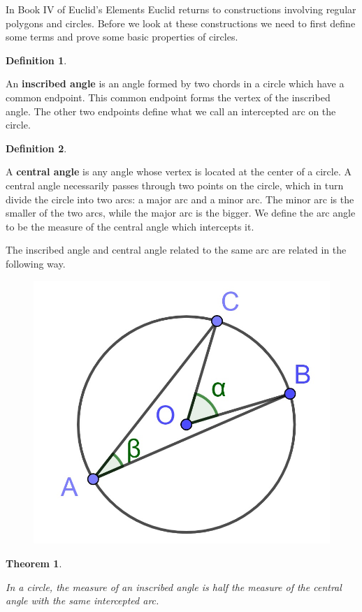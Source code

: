 \documentclass[
]{book}
\newtheorem{theorem}{Theorem}[chapter]
\theoremstyle{definition}
\newtheorem{definition}{Definition}[chapter]
\theoremstyle{definition}
\theoremstyle{definition}
\theoremstyle{definition}
\theoremstyle{remark}
\begin{document}
In Book IV of Euclid's Elements \citep{Heath1908_2} Euclid returns to constructions involving regular polygons and circles. Before we look at these constructions we need to first define some terms and prove some basic properties of circles.

\begin{definition}
\protect\hypertarget{def:unlabeled-div-199}{}\label{def:unlabeled-div-199}

An \textbf{inscribed angle} is an angle formed by two chords in a circle which have a common endpoint. This common endpoint forms the vertex of the inscribed angle. The other two endpoints define what we call an intercepted arc on the circle.

\end{definition}

\begin{definition}
\protect\hypertarget{def:unlabeled-div-200}{}\label{def:unlabeled-div-200}

A \textbf{central angle} is any angle whose vertex is located at the center of a circle. A central angle necessarily passes through two points on the circle, which in turn divide the circle into two arcs: a major arc and a minor arc. The minor arc is the smaller of the two arcs, while the major arc is the bigger. We define the arc angle to be the measure of the central angle which intercepts it.

\end{definition}

The inscribed angle and central angle related to the same arc are related in the following way.

\begin{figure}

{\centering \includegraphics[width=0.3\linewidth]{images/ArcAngles} 

}

\end{figure}

\begin{theorem}
\protect\hypertarget{thm:unlabeled-div-201}{}\label{thm:unlabeled-div-201}

In a circle, the measure of an inscribed angle is half the measure of the central angle with the same intercepted arc.

\end{theorem}
\end{document}
